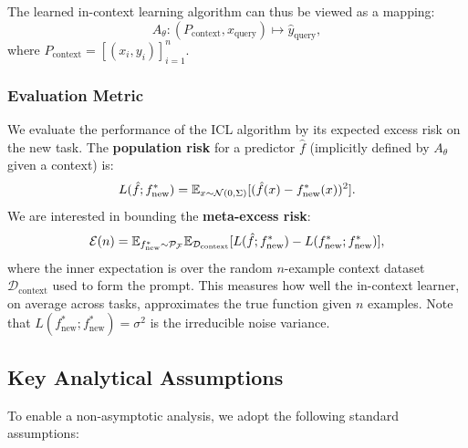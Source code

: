 The learned in-context learning algorithm can thus be viewed as a mapping:
\[
A_{\theta}: (P_{\text{context}}, x_{\text{query}}) \mapsto \hat{y}_{\text{query}},
\]
where \( P_{\text{context}} = [(x_i, y_i)]_{i=1}^n \).

\subsubsection{Evaluation Metric}
We evaluate the performance of the ICL algorithm by its expected excess risk on the new task. The \textbf{population risk} for a predictor \( \hat{f} \) (implicitly defined by \( A_{\theta} \) given a context) is:
\[
L(\hat{f}; f^*_{\text{new}}) = \mathbb{E}_{x \sim \mathcal{N}(0, \Sigma)}[(\hat{f}(x) - f^*_{\text{new}}(x))^2].
\]
We are interested in bounding the \textbf{meta-excess risk}:
\begin{equation}
	\mathcal{E}(n) = \mathbb{E}_{f^*_{\text{new}} \sim \mathcal{P}_{\mathcal{F}}} \mathbb{E}_{\mathcal{D}_{\text{context}}} [ L(\hat{f}; f^*_{\text{new}}) - L(f^*_{\text{new}}; f^*_{\text{new}}) ],
	\label{eq:meta_excess_risk}
\end{equation}
where the inner expectation is over the random \( n \)-example context dataset \( \mathcal{D}_{\text{context}} \) used to form the prompt. This measures how well the in-context learner, on average across tasks, approximates the true function given \( n \) examples. Note that \( L(f^*_{\text{new}}; f^*_{\text{new}}) = \sigma^2 \) is the irreducible noise variance.

\subsection{Key Analytical Assumptions}
\label{subsec:assumptions}

To enable a non-asymptotic analysis, we adopt the following standard assumptions:

